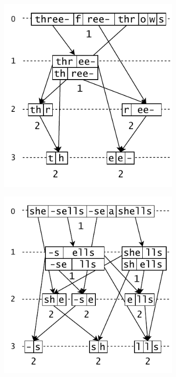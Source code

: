 \newpage
\begin{figure}
    \centering
    \begin{subfigure}[c]{0.48\textwidth}
        \includegraphics[scale=0.68, width=\textwidth]{images/three_free_throws.pdf}
    \end{subfigure}
    \hfill
    \begin{subfigure}[c]{0.50\textwidth}
        \includegraphics[scale=0.68, width=\textwidth]{images/she-sells-seashells.pdf}

\end{subfigure}
\end{figure}
